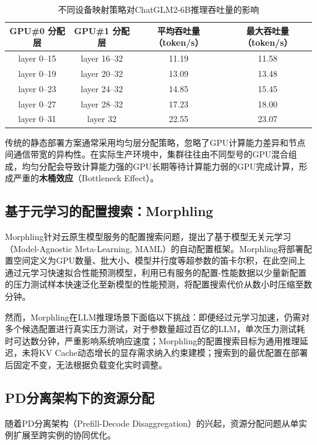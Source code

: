 \begin{table}[htbp]
  \centering
  \caption{不同设备映射策略对ChatGLM2-6B推理吞吐量的影响}
  \label{tab:devicemap_impact}
  \begin{tabular}{cccc}
    \toprule
    \textbf{GPU\#0 分配层} & \textbf{GPU\#1 分配层} &
    \textbf{平均吞吐量（token/s）} & \textbf{最大吞吐量（token/s）} \\
    \midrule
    layer 0--15  & layer 16--32 & 11.19 & 11.58 \\
    layer 0--19  & layer 20--32 & 13.09 & 13.48 \\
    layer 0--23  & layer 24--32 & 14.85 & 15.45 \\
    layer 0--27  & layer 28--32 & 17.23 & 18.00 \\
    layer 0--31  & layer 32     & 22.55 & 23.07 \\
    \bottomrule
  \end{tabular}
\end{table}

传统的静态部署方案通常采用均匀层分配策略，忽略了GPU计算能力差异和节点间通信带宽的异构性。在实际生产环境中，集群往往由不同型号的GPU混合组成，均匀分配会导致计算能力强的GPU长期等待计算能力弱的GPU完成计算，形成严重的\textbf{木桶效应}（Bottleneck Effect）。

\subsection{基于元学习的配置搜索：Morphling}

Morphling\cite{wang2021morphling}针对云原生模型服务的配置搜索问题，提出了基于模型无关元学习（Model-Agnostic Meta-Learning, MAML）的自动配置框架。Morphling将部署配置空间定义为GPU数量、批大小、模型并行度等超参数的笛卡尔积，在此空间上通过元学习快速拟合性能预测模型，利用已有服务的配置-性能数据以少量新配置的压力测试样本快速泛化至新模型的性能预测，将配置搜索代价从数小时压缩至数分钟。

然而，Morphling在LLM推理场景下面临以下挑战：即便经过元学习加速，仍需对多个候选配置进行真实压力测试，对于参数量超过百亿的LLM，单次压力测试耗时可达数分钟，严重影响系统响应速度；Morphling的配置搜索目标为通用推理延迟，未将KV Cache动态增长的显存需求纳入约束建模；搜索到的最优配置在部署后固定不变，无法根据负载变化实时调整。

\subsection{PD分离架构下的资源分配}

随着PD分离架构（Prefill-Decode Disaggregation）的兴起，资源分配问题从单实例扩展至跨实例的协同优化。

